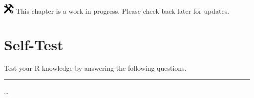 \documentclass[
]{book}
\begin{document}
\includegraphics[width=0.20833in,height=0.20833in]{figures/underconstruction.png} This chapter is a work in progress. Please check back later for updates.

\hypertarget{self-test}{%
\chapter*{Self-Test}\label{self-test}}

Test your R knowledge by answering the following questions.

\begin{center}\rule{0.5\linewidth}{0.5pt}\end{center}

\ldots{}
\end{document}
